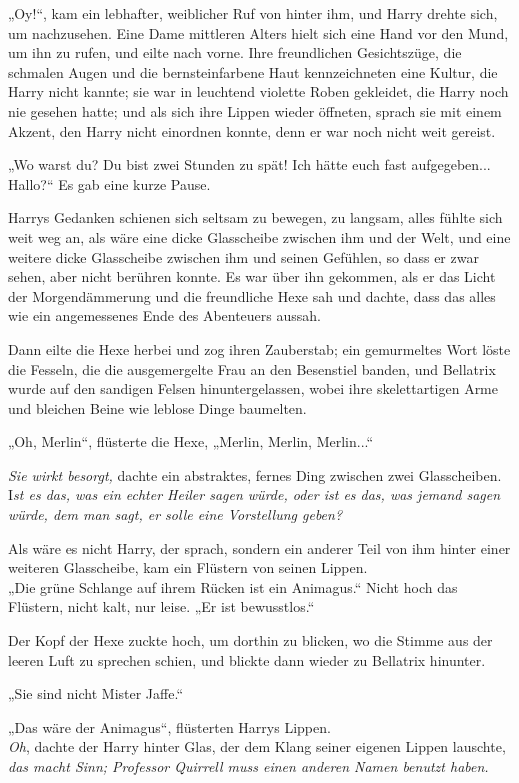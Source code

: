 {„Oy!“, kam ein lebhafter, weiblicher Ruf von hinter ihm, und Harry drehte sich, um nachzusehen. Eine Dame mittleren Alters hielt sich eine Hand vor den Mund, um ihn zu rufen, und eilte nach vorne. Ihre freundlichen Gesichtszüge, die schmalen Augen und die bernsteinfarbene Haut kennzeichneten eine Kultur, die Harry nicht kannte; sie war in leuchtend violette Roben gekleidet, die Harry noch nie gesehen hatte; und als sich ihre Lippen wieder öffneten, sprach sie mit einem Akzent, den Harry nicht einordnen konnte, denn er war noch nicht weit gereist.

„Wo warst du? Du bist zwei Stunden zu spät! Ich hätte euch fast aufgegeben... Hallo?“ Es gab eine kurze Pause.

Harrys Gedanken schienen sich seltsam zu bewegen, zu langsam, alles fühlte sich weit weg an, als wäre eine dicke Glasscheibe zwischen ihm und der Welt, und eine weitere dicke Glasscheibe zwischen ihm und seinen Gefühlen, so dass er zwar sehen, aber nicht berühren konnte. Es war über ihn gekommen, als er das Licht der Morgendämmerung und die freundliche Hexe sah und dachte, dass das alles wie ein angemessenes Ende des Abenteuers aussah.

Dann eilte die Hexe herbei und zog ihren Zauberstab; ein gemurmeltes Wort löste die Fesseln, die die ausgemergelte Frau an den Besenstiel banden, und Bellatrix wurde auf den sandigen Felsen hinuntergelassen, wobei ihre skelettartigen Arme und bleichen Beine wie leblose Dinge baumelten.

„Oh, Merlin“, flüsterte die Hexe, „Merlin, Merlin, Merlin...“

\emph{Sie wirkt besorgt,} dachte ein abstraktes, fernes Ding zwischen zwei Glasscheiben. I\emph{st es das, was ein echter Heiler sagen würde, oder ist es das, was jemand sagen würde, dem man sagt, er solle eine Vorstellung geben?}

Als wäre es nicht Harry, der sprach, sondern ein anderer Teil von ihm hinter einer weiteren Glasscheibe, kam ein Flüstern von seinen Lippen.\\ „Die grüne Schlange auf ihrem Rücken ist ein Animagus.“ Nicht hoch das Flüstern, nicht kalt, nur leise. „Er ist bewusstlos.“

Der Kopf der Hexe zuckte hoch, um dorthin zu blicken, wo die Stimme aus der leeren Luft zu sprechen schien, und blickte dann wieder zu Bellatrix hinunter.

„Sie sind nicht Mister Jaffe.“

„Das wäre der Animagus“, flüsterten Harrys Lippen.\\ \emph{Oh}, dachte der Harry hinter Glas, der dem Klang seiner eigenen Lippen lauschte, \emph{das macht Sinn; Professor Quirrell muss einen anderen Namen benutzt haben.}

}
